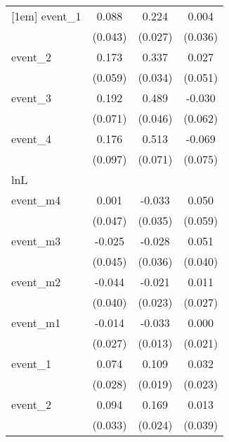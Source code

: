 {\begin{tabular}{l*{3}{c}}
[1em]
event\_1     &       0.088\sym{*}  &       0.224\sym{***}&       0.004         \\
            &     (0.043)         &     (0.027)         &     (0.036)         \\
[1em]
event\_2     &       0.173\sym{**} &       0.337\sym{***}&       0.027         \\
            &     (0.059)         &     (0.034)         &     (0.051)         \\
[1em]
event\_3     &       0.192\sym{**} &       0.489\sym{***}&      -0.030         \\
            &     (0.071)         &     (0.046)         &     (0.062)         \\
[1em]
event\_4     &       0.176         &       0.513\sym{***}&      -0.069         \\
            &     (0.097)         &     (0.071)         &     (0.075)         \\
\hline
lnL         &                     &                     &                     \\
event\_m4    &       0.001         &      -0.033         &       0.050         \\
            &     (0.047)         &     (0.035)         &     (0.059)         \\
[1em]
event\_m3    &      -0.025         &      -0.028         &       0.051         \\
            &     (0.045)         &     (0.036)         &     (0.040)         \\
[1em]
event\_m2    &      -0.044         &      -0.021         &       0.011         \\
            &     (0.040)         &     (0.023)         &     (0.027)         \\
[1em]
event\_m1    &      -0.014         &      -0.033\sym{*}  &       0.000         \\
            &     (0.027)         &     (0.013)         &     (0.021)         \\
[1em]
event\_1     &       0.074\sym{**} &       0.109\sym{***}&       0.032         \\
            &     (0.028)         &     (0.019)         &     (0.023)         \\
[1em]
event\_2     &       0.094\sym{**} &       0.169\sym{***}&       0.013         \\
            &     (0.033)         &     (0.024)         &     (0.039)         \\

\end{tabular}}
